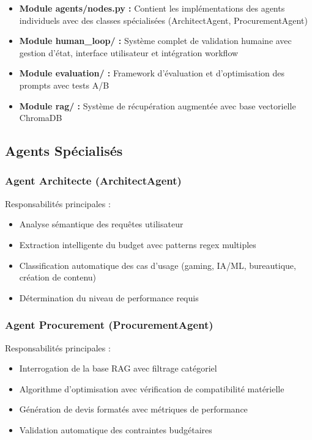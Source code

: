 \documentclass[12pt,a4paper]{article}
\begin{document}
\begin{itemize}
    \item \textbf{Module agents/nodes.py :} Contient les impl\'ementations des agents individuels avec des classes sp\'ecialis\'ees (ArchitectAgent, ProcurementAgent)
    \item \textbf{Module human\_loop/ :} Syst\`eme complet de validation humaine avec gestion d'\'etat, interface utilisateur et int\'egration workflow
    \item \textbf{Module evaluation/ :} Framework d'\'evaluation et d'optimisation des prompts avec tests A/B
    \item \textbf{Module rag/ :} Syst\`eme de r\'ecup\'eration augment\'ee avec base vectorielle ChromaDB
\end{itemize}

\subsection{Agents Sp\'ecialis\'es}

\subsubsection{Agent Architecte (ArchitectAgent)}
Responsabilit\'es principales :
\begin{itemize}
    \item Analyse s\'emantique des requ\^etes utilisateur
    \item Extraction intelligente du budget avec patterns regex multiples
    \item Classification automatique des cas d'usage (gaming, IA/ML, bureautique, cr\'eation de contenu)
    \item D\'etermination du niveau de performance requis
\end{itemize}

\subsubsection{Agent Procurement (ProcurementAgent)}
Responsabilit\'es principales :
\begin{itemize}
    \item Interrogation de la base RAG avec filtrage cat\'egoriel
    \item Algorithme d'optimisation avec v\'erification de compatibilit\'e mat\'erielle
    \item G\'en\'eration de devis format\'es avec m\'etriques de performance
    \item Validation automatique des contraintes budg\'etaires
\end{itemize}
\end{document}
